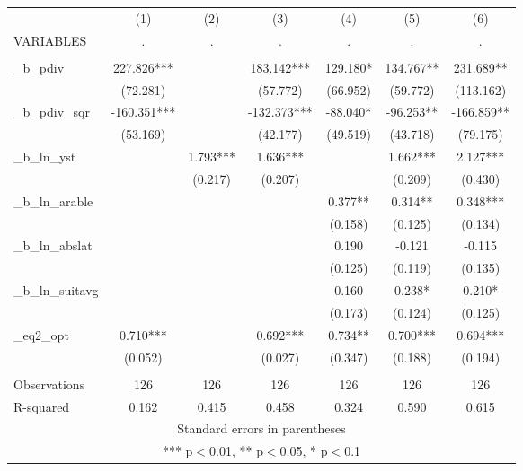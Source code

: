 \documentclass[]{article}
\begin{document}
\begin{tabular}{lcccccc} \hline
 & (1) & (2) & (3) & (4) & (5) & (6) \\
VARIABLES & . & . & . & . & . & . \\ \hline
 &  &  &  &  &  &  \\
\_b\_pdiv & 227.826*** &  & 183.142*** & 129.180* & 134.767** & 231.689** \\
 & (72.281) &  & (57.772) & (66.952) & (59.772) & (113.162) \\
\_b\_pdiv\_sqr & -160.351*** &  & -132.373*** & -88.040* & -96.253** & -166.859** \\
 & (53.169) &  & (42.177) & (49.519) & (43.718) & (79.175) \\
\_b\_ln\_yst &  & 1.793*** & 1.636*** &  & 1.662*** & 2.127*** \\
 &  & (0.217) & (0.207) &  & (0.209) & (0.430) \\
\_b\_ln\_arable &  &  &  & 0.377** & 0.314** & 0.348*** \\
 &  &  &  & (0.158) & (0.125) & (0.134) \\
\_b\_ln\_abslat &  &  &  & 0.190 & -0.121 & -0.115 \\
 &  &  &  & (0.125) & (0.119) & (0.135) \\
\_b\_ln\_suitavg &  &  &  & 0.160 & 0.238* & 0.210* \\
 &  &  &  & (0.173) & (0.124) & (0.125) \\
\_eq2\_opt & 0.710*** &  & 0.692*** & 0.734** & 0.700*** & 0.694*** \\
 & (0.052) &  & (0.027) & (0.347) & (0.188) & (0.194) \\
 &  &  &  &  &  &  \\
Observations & 126 & 126 & 126 & 126 & 126 & 126 \\
 R-squared & 0.162 & 0.415 & 0.458 & 0.324 & 0.590 & 0.615 \\ \hline
\multicolumn{7}{c}{ Standard errors in parentheses} \\
\multicolumn{7}{c}{ *** p$<$0.01, ** p$<$0.05, * p$<$0.1} \\
\end{tabular}
\end{document}
